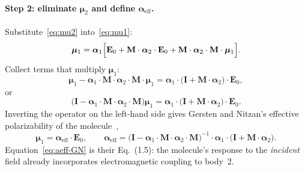 \documentclass[11pt,a4paper]{article}
\begin{document}
\paragraph{Step 2: eliminate $\boldsymbol{\mu}_2$ and define $\boldsymbol{\alpha}_{\mathrm{eff}}$.}
Substitute~\eqref{eq:mu2} into~\eqref{eq:mu1}:
\begin{equation}
  \boldsymbol{\mu}_1
  =
  \boldsymbol{\alpha}_1
  \Bigl[
    \mathbf{E}_0
    +
    \mathbf{M}\cdot\boldsymbol{\alpha}_2\cdot\mathbf{E}_0
    +
    \mathbf{M}\cdot\boldsymbol{\alpha}_2\cdot\mathbf{M}\cdot\boldsymbol{\mu}_1
  \Bigr].
\end{equation}
Collect terms that multiply $\boldsymbol{\mu}_1$:
\begin{equation}
  \boldsymbol{\mu}_1
  -
  \boldsymbol{\alpha}_1\cdot\mathbf{M}\cdot\boldsymbol{\alpha}_2\cdot\mathbf{M}\cdot\boldsymbol{\mu}_1
  =
  \boldsymbol{\alpha}_1\cdot\bigl(\mathbf{I}+\mathbf{M}\cdot\boldsymbol{\alpha}_2\bigr)\cdot\mathbf{E}_0,
\end{equation}
or
\begin{equation}
  \bigl(
    \mathbf{I}
    -
    \boldsymbol{\alpha}_1\cdot\mathbf{M}\cdot\boldsymbol{\alpha}_2\cdot\mathbf{M}
  \bigr)
  \boldsymbol{\mu}_1
  =
  \boldsymbol{\alpha}_1\cdot\bigl(\mathbf{I}+\mathbf{M}\cdot\boldsymbol{\alpha}_2\bigr)\cdot\mathbf{E}_0.
  \label{eq:mu1-lin}
\end{equation}
Inverting the operator on the left-hand side gives Gersten and Nitzan's effective
polarizability of the molecule~\citep{gersten1980},
\begin{equation}
  \boldsymbol{\mu}_1
  =
  \boldsymbol{\alpha}_{\mathrm{eff}}\cdot\mathbf{E}_0,
  \qquad
  \boldsymbol{\alpha}_{\mathrm{eff}}
  =
  \bigl(
    \mathbf{I}
    -
    \boldsymbol{\alpha}_1\cdot\mathbf{M}\cdot\boldsymbol{\alpha}_2\cdot\mathbf{M}
  \bigr)^{-1}
  \cdot
  \boldsymbol{\alpha}_1
  \cdot
  \bigl(
    \mathbf{I}
    +
    \mathbf{M}\cdot\boldsymbol{\alpha}_2
  \bigr).
  \label{eq:aeff-GN}
\end{equation}
Equation~\eqref{eq:aeff-GN} is their Eq.~(1.5): the molecule's response to the
\emph{incident} field already incorporates electromagnetic coupling to body~2.
\end{document}
